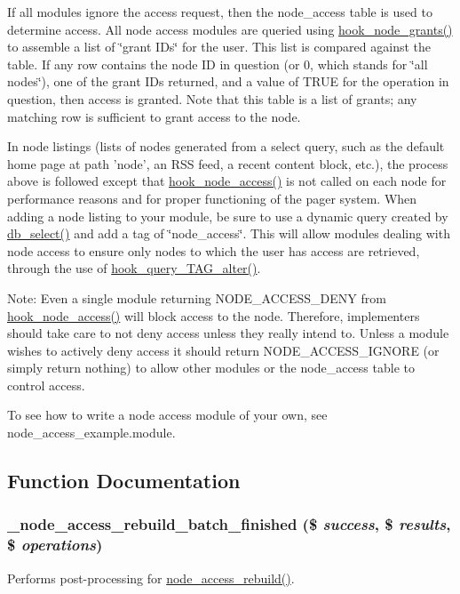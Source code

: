 If all modules ignore the access request, then the node\_\-access table is used to determine access. All node access modules are queried using \hyperlink{group__node__access_gaa973f2ab6ab14c3fa14e5138c6d69ecf}{hook\_\-node\_\-grants()} to assemble a list of \char`\"{}grant IDs\char`\"{} for the user. This list is compared against the table. If any row contains the node ID in question (or 0, which stands for \char`\"{}all nodes\char`\"{}), one of the grant IDs returned, and a value of TRUE for the operation in question, then access is granted. Note that this table is a list of grants; any matching row is sufficient to grant access to the node.

In node listings (lists of nodes generated from a select query, such as the default home page at path 'node', an RSS feed, a recent content block, etc.), the process above is followed except that \hyperlink{group__node__access_ga75a280ea1fbe0fb6ca034f8aad06d58d}{hook\_\-node\_\-access()} is not called on each node for performance reasons and for proper functioning of the pager system. When adding a node listing to your module, be sure to use a dynamic query created by \hyperlink{group__database_ga9e030cee657d64e3d8e524c65814cc9f}{db\_\-select()} and add a tag of \char`\"{}node\_\-access\char`\"{}. This will allow modules dealing with node access to ensure only nodes to which the user has access are retrieved, through the use of \hyperlink{group__hooks_ga12527037deeb76adcab1000e984fdfce}{hook\_\-query\_\-TAG\_\-alter()}.

Note: Even a single module returning NODE\_\-ACCESS\_\-DENY from \hyperlink{group__node__access_ga75a280ea1fbe0fb6ca034f8aad06d58d}{hook\_\-node\_\-access()} will block access to the node. Therefore, implementers should take care to not deny access unless they really intend to. Unless a module wishes to actively deny access it should return NODE\_\-ACCESS\_\-IGNORE (or simply return nothing) to allow other modules or the node\_\-access table to control access.

To see how to write a node access module of your own, see node\_\-access\_\-example.module. 

\subsection{Function Documentation}
\hypertarget{group__node__access_gaa7feee934ce635e386628b570901ff38}{
\subsubsection[{\_\-node\_\-access\_\-rebuild\_\-batch\_\-finished}]{\setlength{\rightskip}{0pt plus 5cm}\_\-node\_\-access\_\-rebuild\_\-batch\_\-finished (\$ {\em success}, \/  \$ {\em results}, \/  \$ {\em operations})}}
\label{group__node__access_gaa7feee934ce635e386628b570901ff38}
Performs post-\/processing for \hyperlink{group__node__access_gaf04007aedfc3afbe074b2fe4065ab618}{node\_\-access\_\-rebuild()}.


